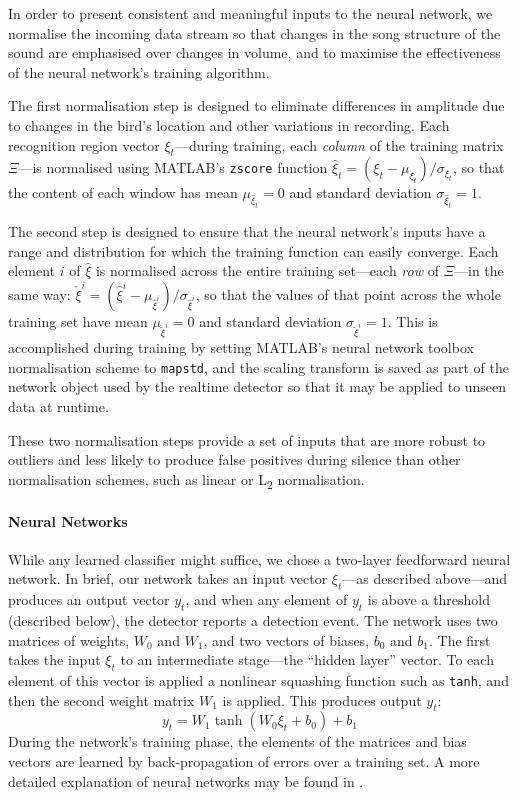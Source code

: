 \documentclass[10pt,letterpaper]{article}
\renewcommand{\subsubsection}[1]{\paragraph{#1}}
\begin{document}
In order to present consistent and meaningful inputs to the neural
network, we normalise the incoming data stream so that changes in the
song structure of the sound are emphasised over changes in volume, and
to maximise the effectiveness of the neural network's training
algorithm.

The first normalisation step is designed to eliminate differences in
amplitude due to changes in the bird's location and other variations
in recording.  Each recognition region vector $\xi_t$---during
training, each {\em column} of the training matrix $\Xi$---is
normalised using MATLAB's {\tt zscore} function $\hat{\xi}_t = (\xi_t
- \mu_{\xi_t}) / \sigma_{\xi_t}$, so that the content of each window
has mean $\mu_{\hat{\xi}_t}=0$ and standard deviation
$\sigma_{\hat{\xi}_t}=1$.

The second step is designed to ensure that the neural network's inputs
have a range and distribution for which the training function can
easily converge.  Each element $i$ of $\hat{\xi}$ is normalised across
the entire training set---each {\em row} of $\Xi$---in the same way:
$\check{\xi}^i = (\hat{\xi}^i -
\mu_{\hat{\xi}^i})/\sigma_{\hat{\xi}^i}$, so that the values of that
point across the whole training set have mean $\mu_{\check{\xi}^i}=0$
and standard deviation $\sigma_{\check{\xi}^i}=1$.  This is
accomplished during training by setting MATLAB's neural network
toolbox normalisation scheme to {\tt mapstd}, and the scaling
transform is saved as part of the network object used by the realtime
detector so that it may be applied to unseen data at runtime.

These two normalisation steps provide a set of inputs that are more
robust to outliers and less likely to produce false positives during
silence than other normalisation schemes, such as linear or
L\textsubscript{2} normalisation.

\subsubsection{Neural Networks}

While any learned classifier might suffice, we chose a two-layer
feedforward neural network.  In brief, our network takes an input
vector $\xi_t$---as described above---and produces an output vector
$y_t$, and when any element of $y_t$ is above a threshold (described
below), the detector reports a detection event.  The network uses two
matrices of weights, $W_0$ and $W_1$, and two vectors of biases, $b_0$
and $b_1$.  The first takes the input $\xi_t$ to an intermediate
stage---the ``hidden layer'' vector.  To each element of this vector
is applied a nonlinear squashing function such as {\tt tanh}, and then
the second weight matrix $W_1$ is applied.  This produces output
$y_t$:
\begin{equation*}
  y_t = W_1 \tanh (W_0 \xi_t + b_0) + b_1
\end{equation*}
During the network's training phase, the elements of the matrices and
bias vectors are learned by back-propagation of errors over a training
set.  A more detailed explanation of neural networks may be found in
\cite{hkp}.
\end{document}
